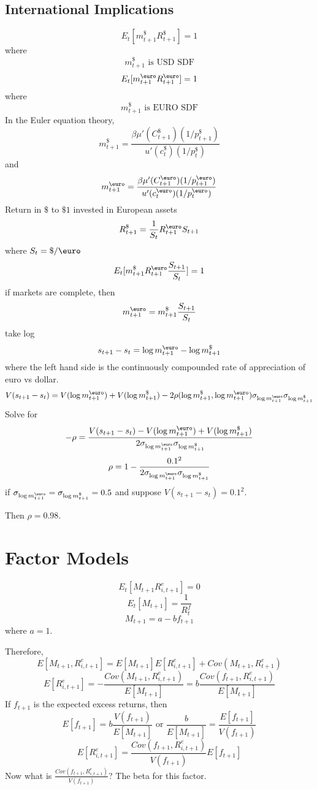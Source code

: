 \documentclass[11pt, a4paper, oneside]{article}
\theoremstyle{definition}
\theoremstyle{proposition}
\theoremstyle{corollary}
\theoremstyle{lemma}
\theoremstyle{theorem}
\begin{document}
\subsection{International Implications}
$$E_t[m_{t+1}^{\$}R_{t+1}^{\$}] = 1$$ where 
$$m_{t+1}^{\$} \text{ is USD SDF}$$
$$E_t[m_{t+1}^{\text{\euro}}R_{t+1}^{\text{\euro}}] = 1$$ where 
$$m_{t+1}^{\$} \text{ is EURO SDF}$$
In the Euler equation theory, 
$$m_{t+1}^{\$} = \frac{\beta \mu'(C_{t+1}^{\$})(1/p_{t+1}^{\$})}{u'(c_t^{\$})(1/p_t^{\$})}$$ 
and 
$$m_{t+1}^{\text{\euro}} = \frac{\beta \mu'(C_{t+1}^{\text{\euro}})(1/p_{t+1}^{\text{\euro}})}{u'(c_t^{\text{\euro}})(1/p_t^{\text{\euro}})}$$ 
Return in $\$$ to $\$1$ invested in European assets 
$$R_{t+1}^{\$} = \frac{1}{S_t} R_{t+1}^{\text{\euro}}S_{t+1}$$ where $S_{t} = \$/\text{\euro}$
$$E_t[m_{t+1}^{\$} R_{t+1}^{\text{\euro}} \frac{S_{t+1}}{S_{t}}] = 1$$
if markets are complete, then
$$m_{t+1}^{\text{\euro}} = m_{t+1}^{\$} \frac{S_{t+ 1}}{S_t}$$
take log 
$$s_{t +1} - s_t = \log{m_{t+1}^{\text{\euro}}} - \log{m_{t+1}^{\$}}$$
where the left hand side is the continuously compounded rate of appreciation of euro vs dollar. 
$$V(s_{t +1} - s_t ) = V( \log{m_{t+1}^{\text{\euro}}})+ V(\log{m_{t+1}^{\$}}) -2\rho(\log{m_{t+1}^{\$}}, \log{m_{t+1}^{\text{\euro}}})\sigma_{\log{m_{t+1}^{\text{\euro}}} }\sigma_{\log{m_{t+1}^{\$}}}$$
Solve for $$-\rho = \frac{V(s_{t +1} - s_t ) - V( \log{m_{t+1}^{\text{\euro}}})+ V(\log{m_{t+1}^{\$}})}{2\sigma_{\log{m_{t+1}^{\text{\euro}}} }\sigma_{\log{m_{t+1}^{\$}}}}$$
$$\rho = 1- \frac{0.1^2}{2\sigma_{\log{m_{t+1}^{\text{\euro}}} }\sigma_{\log{m_{t+1}^{\$}}}}$$
if $\sigma_{\log{m_{t+1}^{\text{\euro}}} } = \sigma_{\log{m_{t+1}^{\$}}} = 0.5$ and suppose $V(s_{t +1} - s_t )  = 0.1^2$. 

Then $\rho = 0.98$. 

\section{Factor Models}
$$E_t[M_{t+1} R_{i, t+1}^e] = 0$$
$$E_t[M_{t+1}] = \frac{1}{R_t^f}$$
$$M_{t+1} = a - bf_{t+1}$$ where $a = 1$.

Therefore, $$E[M_{t+1},R_{i, t+1}^e] = E[M_{t+1}]E[R_{i, t+1}^e] + Cov(M_{t+1}, R_{t+1}^e)$$
$$E[R_{i, t+1}^e] = -\frac{Cov(M_{t+1}, R_{i, t+1}^e)}{E[M_{t+1}]} = b\frac{Cov(f_{t+1}, R_{i, t+1}^e)}{E[M_{t+1}]}$$
If $f_{t+1}$ is the expected excess returns, then
$$E[f_{t+1}] = b\frac{V(f_{t+1})}{E[M_{t+1}]} \text{ or } \frac{b}{E[M_{t+1}]} = \frac{E[f_{t+1}]}{V(f_{t+1})}$$
$$E[R_{i, t+1}^e] = \frac{Cov(f_{t+1}, R_{i, t+1}^e)}{V(f_{t+1})}E[f_{t+1}]$$
Now what is $\frac{Cov(f_{t+1}, R_{i, t+1}^e)}{V(f_{t+1})}$? The beta for this factor. 
\end{document}
